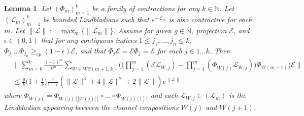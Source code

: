 \documentclass[accepted=2026-02-01, letterpaper]{quantumarticle}
\newtheorem{lemma}{Lemma}[section]
\newcommand{\NN}{\mathbb{N}}
\newcommand{\E}{\mathcal{E}}
\renewcommand{\L}{\mathcal{L}}
\begin{document}
\begin{lemma} \label{lem:zenolem}
Let $(\Phi_m)_{m=1}^k$ be a family of contractions for any $k \in \NN$. Let $(\L_m)_{m=1}^k$ be bounded Lindbladians such that $e^{-\L_m}$ is also contractive for each $m$. Let $\|\L\| := \max_m \{\| \L_m \|\}$. Assume for given $g \in \NN$, projection $\E$, and $\epsilon \in (0,1)$ that for any contiguous indices $1 \leq j_1, ..., j_n \leq k$, $\Phi_{j_1} ... \Phi_{j_n} \geq_{cp} (1 - \epsilon) \E$, and that $\Phi_j \E = \E \Phi_j = \E$ for each $j \in 1...k$. Then
\begin{equation*}
\begin{split}
& \bigg \| \sum_{m=0}^k \frac{(-1)^m}{k^m} \sum_{W \in WS(m+1,k)} \Big ( \Big ( \prod_{j=1}^m (\E \L_{W,j})
    - \prod_{j=1}^m (\Phi_{W(j)} \L_{W,j}) \Big ) \Phi_{W(m+1)} \Big ) \E \bigg \|
\\ & \leq \frac{g}{k} \Big ( 1 + \frac{1}{k} \Big ) \frac{1}{1-\epsilon} (\|\L\|^3 + 4 \|\L\|^2 + 2 \|\L\|) e^{\|\L\|}
\end{split}
\end{equation*}
where $\Phi_{W(j)} = \Phi_{W(j)[|W(j)|]} \circ ... \circ \Phi_{W(j)[1]}$, and each $\L_{W,j} \in (\L_m)$ is the Lindbladian appearing between the channel compositions $W(j)$ and $W(j+1)$.
\end{lemma}
\end{document}
